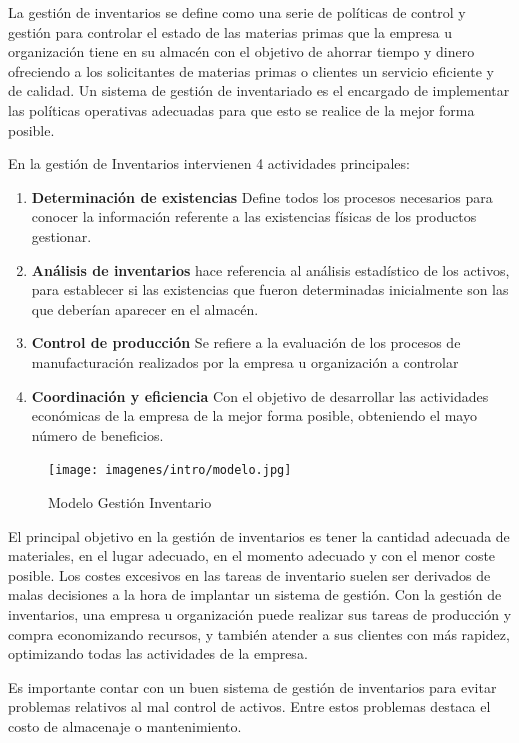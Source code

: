 \documentclass[a4paper,11pt]{book}
\begin{document}
La gestión de inventarios\cite{gestion} se define como una serie de políticas de control y gestión para controlar el estado de las materias primas que la empresa u organización tiene en su almacén con el objetivo de ahorrar tiempo y dinero ofreciendo a los solicitantes de materias primas o clientes un servicio eficiente y de calidad. Un sistema de gestión de inventariado es el encargado de implementar las políticas operativas adecuadas para que esto se realice de la mejor forma posible. 

En la gestión de Inventarios intervienen 4 actividades principales:


\begin{enumerate}
\item \textbf{Determinación de existencias} Define todos los procesos necesarios para conocer la información referente a las existencias físicas de los productos gestionar.
\item \textbf{Análisis de inventarios} hace referencia al análisis estadístico de los activos, para establecer si las existencias que fueron determinadas inicialmente son las que deberían aparecer en el almacén.  
\item \textbf{Control de producción} Se refiere a la evaluación de los procesos de manufacturación realizados por la empresa u organización a controlar
\item \textbf{Coordinación y eficiencia} Con el objetivo de desarrollar las actividades económicas de la empresa de la mejor forma posible, obteniendo el mayo número de beneficios. 
\end{enumerate}
 
 
\begin{figure}[H]  
\centering 
\texttt{[image: imagenes/intro/modelo.jpg]}
\caption{ Modelo Gestión Inventario\cite{modelo} }  
\end{figure} 

El principal objetivo en la gestión de inventarios es tener la cantidad adecuada de materiales, en el lugar adecuado, en el momento adecuado y con el menor coste posible. Los costes excesivos en las tareas de inventario suelen ser derivados de malas decisiones a la hora de implantar un sistema de gestión.  Con la gestión de inventarios, una empresa u organización puede realizar sus tareas de producción y compra economizando recursos, y también atender a sus clientes con más rapidez, optimizando todas las actividades de la empresa.

Es importante contar con un buen sistema de gestión de inventarios para evitar problemas relativos al mal control de activos. Entre estos problemas destaca el costo de almacenaje o mantenimiento. 
\end{document}
